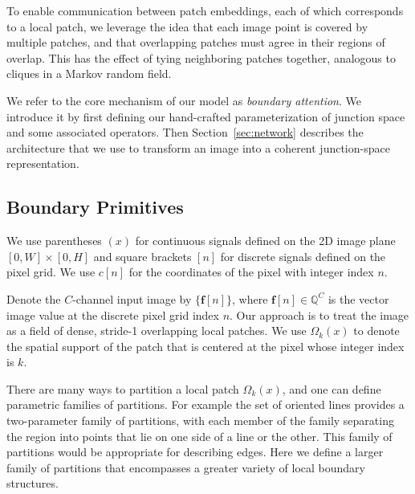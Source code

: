 \documentclass[main.tex]{subfiles}
\begin{document}
To enable communication between patch embeddings, each of which corresponds to a local patch, we leverage the idea that each image point is covered by multiple patches, and that overlapping patches must agree in their regions of overlap. This has the effect of tying neighboring patches together, analogous to cliques in a Markov random field. 

We refer to the core mechanism of our model as \emph{boundary attention}. We introduce it by first defining our hand-crafted parameterization of junction space and some associated operators. Then Section~\ref{sec:network} describes the architecture that we use to transform an image into a coherent junction-space representation.

\subsection{Boundary Primitives}
\label{sec:primitives}

We use parentheses $(x)$ for continuous signals defined on the 2D image plane $[0,W]\times[0,H]$ and square brackets $[n]$ for discrete signals defined on the pixel grid. We use $c[n]$ for the coordinates of the pixel with integer index $n$.

Denote the $C$-channel input image by $\{\mathbf{f}[n]\}$, where $\mathbf{f}[n]\in\mathbb{Q}^C$ is the vector image value at the discrete pixel grid index $n$. Our approach is to treat the image as a field of dense, stride-1 overlapping local patches. We use $\Omega_{k}(x)$ to denote the spatial support of the patch that is centered at the pixel whose integer index is $k$.

There are many ways to partition a local patch $\Omega_k(x)$, and one can define parametric families of partitions. For example the set of oriented lines provides a two-parameter family of partitions, with each member of the family separating the region into points that lie on one side of a line or the other. This family of partitions would be appropriate for describing edges. Here we define a larger family of partitions that encompasses a greater variety of local boundary structures.
\end{document}
